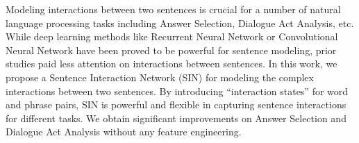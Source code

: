 Modeling interactions between two sentences is crucial for a number of natural language processing tasks including Answer Selection, Dialogue Act Analysis, etc. While deep learning methods like Recurrent Neural Network or Convolutional Neural Network have been proved to be powerful for sentence modeling, prior studies paid less attention on interactions between sentences. In this work, we propose a Sentence Interaction Network (SIN) for modeling the complex interactions between two sentences. By introducing ``interaction states'' for word and phrase pairs, SIN is powerful and flexible in capturing sentence interactions for different tasks. We obtain significant improvements on Answer Selection and Dialogue Act Analysis without any feature engineering.
